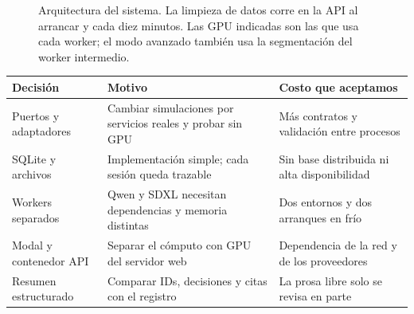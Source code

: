 \documentclass[11pt,a4paper]{article}
\begin{document}
\begin{figure}[h]\centering
{}
\caption{Arquitectura del sistema. La limpieza de datos corre en la API al arrancar y cada diez minutos. Las GPU indicadas son las que usa cada worker; el modo avanzado también usa la segmentación del worker intermedio.}
\end{figure}

\begin{table}[h]\small
\begin{tabularx}{\linewidth}{@{}p{3.0cm}YY@{}}\toprule
Decisión & Motivo & Costo que aceptamos \\\midrule
Puertos y adaptadores & Cambiar simulaciones por servicios reales y probar sin GPU & Más contratos y validación entre procesos \\
SQLite y archivos & Implementación simple; cada sesión queda trazable & Sin base distribuida ni alta disponibilidad \\
Workers separados & Qwen y SDXL necesitan dependencias y memoria distintas & Dos entornos y dos arranques en frío \\
Modal y contenedor API & Separar el cómputo con GPU del servidor web & Dependencia de la red y de los proveedores \\
Resumen estructurado & Comparar IDs, decisiones y citas con el registro & La prosa libre solo se revisa en parte \\\bottomrule
\end{tabularx}
\end{table}
\end{document}
